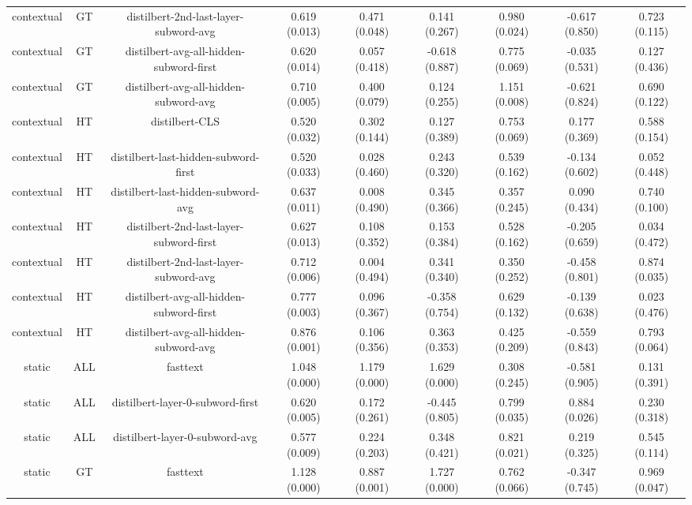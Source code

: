 \begin{sidewaystable}[htb]
\begin{tabular}{@{}ccccccccc@{}}
        contextual & GT & distilbert-2nd-last-layer-subword-avg & 0.619 (0.013) & 0.471 (0.048) & 0.141 (0.267) & 0.980 (0.024) & -0.617 (0.850) & 0.723 (0.115) \\
        contextual & GT & distilbert-avg-all-hidden-subword-first & 0.620 (0.014) & 0.057 (0.418) & -0.618 (0.887) & 0.775 (0.069) & -0.035 (0.531) & 0.127 (0.436) \\
        contextual & GT & distilbert-avg-all-hidden-subword-avg & 0.710 (0.005) & 0.400 (0.079) & 0.124 (0.255) & 1.151 (0.008) & -0.621 (0.824) & 0.690 (0.122) \\
        contextual & HT & distilbert-CLS & 0.520 (0.032) & 0.302 (0.144) & 0.127 (0.389) & 0.753 (0.069) & 0.177 (0.369) & 0.588 (0.154) \\
        contextual & HT & distilbert-last-hidden-subword-first & 0.520 (0.033) & 0.028 (0.460) & 0.243 (0.320) & 0.539 (0.162) & -0.134 (0.602) & 0.052 (0.448) \\
        contextual & HT & distilbert-last-hidden-subword-avg & 0.637 (0.011) & 0.008 (0.490) & 0.345 (0.366) & 0.357 (0.245) & 0.090 (0.434) & 0.740 (0.100) \\
        contextual & HT & distilbert-2nd-last-layer-subword-first & 0.627 (0.013) & 0.108 (0.352) & 0.153 (0.384) & 0.528 (0.162) & -0.205 (0.659) & 0.034 (0.472) \\
        contextual & HT & distilbert-2nd-last-layer-subword-avg & 0.712 (0.006) & 0.004 (0.494) & 0.341 (0.340) & 0.350 (0.252) & -0.458 (0.801) & 0.874 (0.035) \\
        contextual & HT & distilbert-avg-all-hidden-subword-first & 0.777 (0.003) & 0.096 (0.367) & -0.358 (0.754) & 0.629 (0.132) & -0.139 (0.638) & 0.023 (0.476) \\
        contextual & HT & distilbert-avg-all-hidden-subword-avg & 0.876 (0.001) & 0.106 (0.356) & 0.363 (0.353) & 0.425 (0.209) & -0.559 (0.843) & 0.793 (0.064) \\
        static & ALL & fasttext & 1.048 (0.000) & 1.179 (0.000) & 1.629 (0.000) & 0.308 (0.245) & -0.581 (0.905) & 0.131 (0.391) \\
        static & ALL & distilbert-layer-0-subword-first & 0.620 (0.005) & 0.172 (0.261) & -0.445 (0.805) & 0.799 (0.035) & 0.884 (0.026) & 0.230 (0.318) \\
        static & ALL & distilbert-layer-0-subword-avg & 0.577 (0.009) & 0.224 (0.203) & 0.348 (0.421) & 0.821 (0.021) & 0.219 (0.325) & 0.545 (0.114) \\
        static & GT & fasttext & 1.128 (0.000) & 0.887 (0.001) & 1.727 (0.000) & 0.762 (0.066) & -0.347 (0.745) & 0.969 (0.047) \\

\end{tabular}
\end{sidewaystable}
